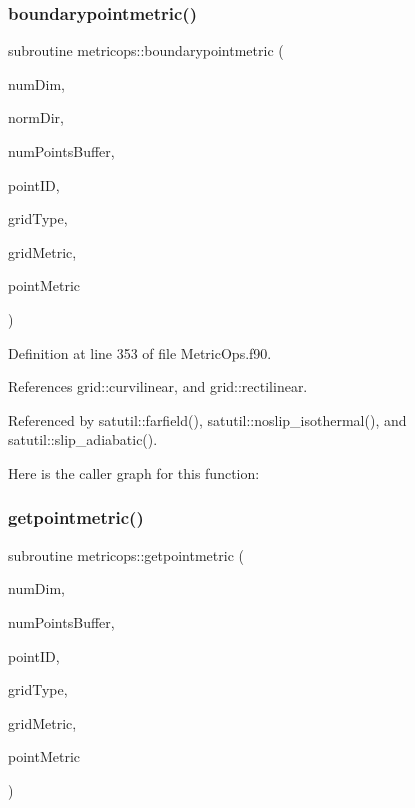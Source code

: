 \subsubsection{\texorpdfstring{boundarypointmetric()}{boundarypointmetric()}}
{\footnotesize\ttfamily subroutine metricops\+::boundarypointmetric (\begin{DoxyParamCaption}\item[{integer(kind=4), intent(in)}]{num\+Dim,  }\item[{integer(kind=4), intent(in)}]{norm\+Dir,  }\item[{integer(kind=8), intent(in)}]{num\+Points\+Buffer,  }\item[{integer(kind=8), intent(in)}]{point\+ID,  }\item[{integer(kind=4), intent(in)}]{grid\+Type,  }\item[{real(kind=8), dimension(numdim$\ast$numdim$\ast$numpointsbuffer), intent(in)}]{grid\+Metric,  }\item[{real(kind=8), dimension(numdim$\ast$numdim), intent(out)}]{point\+Metric }\end{DoxyParamCaption})}



Definition at line 353 of file Metric\+Ops.\+f90.



References grid\+::curvilinear, and grid\+::rectilinear.



Referenced by satutil\+::farfield(), satutil\+::noslip\+\_\+isothermal(), and satutil\+::slip\+\_\+adiabatic().

Here is the caller graph for this function\+:
\hypertarget{namespacemetricops_abbd903fb1fbe7adf2ecf34571e380fa4}{}\label{namespacemetricops_abbd903fb1fbe7adf2ecf34571e380fa4} 
\subsubsection{\texorpdfstring{getpointmetric()}{getpointmetric()}}
{\footnotesize\ttfamily subroutine metricops\+::getpointmetric (\begin{DoxyParamCaption}\item[{integer(kind=4), intent(in)}]{num\+Dim,  }\item[{integer(kind=8), intent(in)}]{num\+Points\+Buffer,  }\item[{integer(kind=8), intent(in)}]{point\+ID,  }\item[{integer(kind=4), intent(in)}]{grid\+Type,  }\item[{real(kind=8), dimension(numdim$\ast$numdim$\ast$numpointsbuffer), intent(in)}]{grid\+Metric,  }\item[{real(kind=8), dimension(numdim$\ast$numdim), intent(out)}]{point\+Metric }\end{DoxyParamCaption})}



